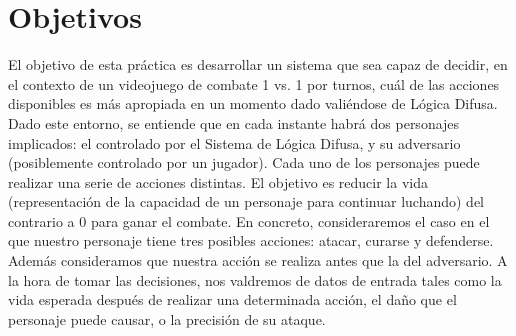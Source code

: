 \section{Objetivos}
El objetivo de esta práctica es desarrollar un sistema que sea capaz de decidir, en el contexto de un videojuego de combate 1 vs. 1 por turnos, cuál de las acciones disponibles es más apropiada en un momento dado valiéndose de Lógica Difusa. 
Dado este entorno, se entiende que en cada instante habrá dos personajes implicados: el controlado por el Sistema de Lógica Difusa, y su adversario (posiblemente controlado por un jugador). Cada uno de los personajes puede realizar una serie de acciones distintas. El objetivo es reducir la vida (representación de la capacidad de un personaje para continuar luchando) del contrario a 0 para ganar el combate.
En concreto, consideraremos el caso en el que nuestro personaje tiene tres posibles acciones: atacar, curarse y defenderse. Además consideramos que nuestra acción se realiza antes que la del adversario. A la hora de tomar las decisiones, nos valdremos de datos de entrada tales como la vida esperada después de realizar una determinada acción, el daño que el personaje puede causar, o la precisión de su ataque.